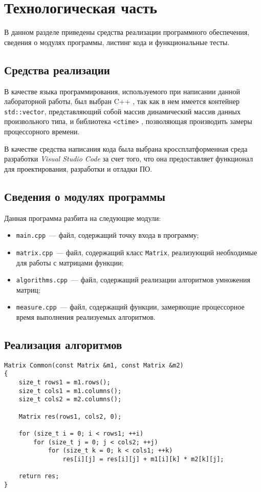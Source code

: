 \chapter{Технологическая часть}

В данном разделе приведены средства реализации программного обеспечения, сведения о модулях программы, листинг кода и функциональные тесты.

\section{Средства реализации}

В качестве языка программирования, используемого при написании данной лабораторной работы, был выбран C++ \cite{cpp-lang}, так как в нем имеется контейнер \texttt{std::vector}, представляющий собой массив динамический массив данных произвольного типа, и библиотека \texttt{<ctime>} \cite{ctime}, позволяющая производить замеры процессорного времени.

В качестве средства написания кода была выбрана кроссплатформенная среда разработки \textit{Visual Studio Code} за счет того, что она предоставляет функционал для проектирования, разработки и отладки ПО.

\section{Сведения о модулях программы}

Данная программа разбита на следующие модули:

\begin{itemize}
    \item \texttt{main.cpp}~--- файл, содержащий точку входа в программу;
    \item \texttt{matrix.cpp}~--- файл, содержащий класс \texttt{Matrix}, реализующий необходимые для работы с матрицами функции;
    \item \texttt{algorithms.cpp}~--- файл, содержащий реализации алгоритмов умножения матриц;
    \item \texttt{measure.cpp}~--- файл, содержащий функции, замеряющие процессорное время выполнения реализуемых алгоритмов.
\end{itemize}

\clearpage
\section{Реализация алгоритмов}

\begin{lstlisting}[label={lst:common}, caption={Реализация классического алгоритма умножения матриц}]
Matrix Common(const Matrix &m1, const Matrix &m2)
{
    size_t rows1 = m1.rows();
    size_t cols1 = m1.columns();
    size_t cols2 = m2.columns();

    Matrix res(rows1, cols2, 0);

    for (size_t i = 0; i < rows1; ++i)
        for (size_t j = 0; j < cols2; ++j)
            for (size_t k = 0; k < cols1; ++k)
                res[i][j] = res[i][j] + m1[i][k] * m2[k][j];

    return res;
}
\end{lstlisting}

